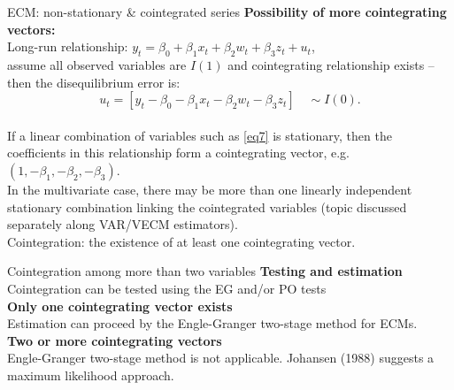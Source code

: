 \documentclass{beamer}
\begin{document}
\begin{frame}{ECM: non-stationary \& cointegrated series}
\textbf{Possibility of more cointegrating vectors:}\\
\medskip
Long-run relationship: $y_t= \beta_0 + \beta_1 x_t + \beta_2 w_t + \beta_3 z_t + u_t$,\\ assume all observed variables are $I(1)$ and cointegrating relationship exists -- then the disequilibrium error is: \\
\begin{equation}  \label{eq7}
u_t= [y_t - \beta_0 - \beta_1 x_t - \beta_2 w_t - \beta_3 z_t ]
\quad \sim I(0). 
\end{equation} \\
\medskip
If a linear combination of variables such as \eqref{eq7} is stationary, then the coefficients in this relationship form a cointegrating vector, e.g. $(1,-\beta_{1},-\beta_{2},-\beta_{3})$. \\
\medskip
In the multivariate case, there may be more than one linearly independent stationary combination linking the cointegrated variables (topic discussed separately along VAR/VECM estimators). \\
\medskip
Cointegration: the existence of at least one cointegrating vector.
\end{frame}
\begin{frame}{Cointegration among more than two variables}
\textbf{Testing and estimation}\\
Cointegration can be tested using the EG and/or PO tests\\ \medskip
\textbf{Only one cointegrating vector exists}\\
Estimation can proceed by the Engle-Granger two-stage method for ECMs. \\ 
\medskip
\textbf{Two or more cointegrating vectors}\\
Engle-Granger two-stage method is not applicable. Johansen (1988) suggests a maximum likelihood approach. \end{frame}
\end{document}
